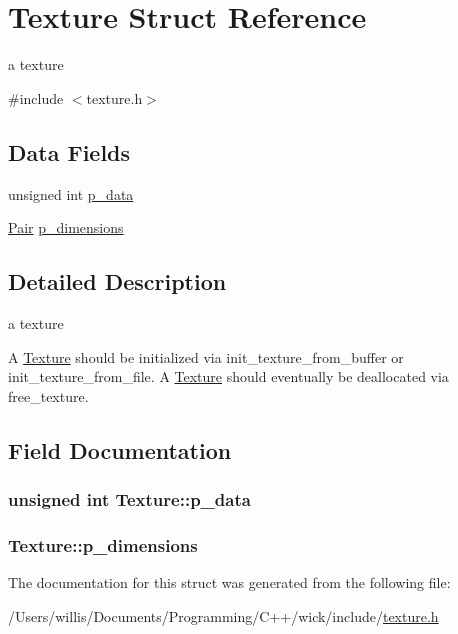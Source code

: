 \hypertarget{struct_texture}{\section{Texture Struct Reference}
\label{struct_texture}
}


a texture  




{\ttfamily \#include $<$texture.\-h$>$}

\subsection*{Data Fields}
\begin{DoxyCompactItemize}
\item 
unsigned int \hyperlink{struct_texture_ab6c572cac09b4bc4ed509d5a9d7b2984}{p\-\_\-data}
\item 
\hyperlink{struct_pair}{Pair} \hyperlink{struct_texture_af9f05640abd9159b4e960e4140b3d936}{p\-\_\-dimensions}
\end{DoxyCompactItemize}


\subsection{Detailed Description}
a texture 

A \hyperlink{struct_texture}{Texture} should be initialized via init\-\_\-texture\-\_\-from\-\_\-buffer or init\-\_\-texture\-\_\-from\-\_\-file. A \hyperlink{struct_texture}{Texture} should eventually be deallocated via free\-\_\-texture. 

\subsection{Field Documentation}
\hypertarget{struct_texture_ab6c572cac09b4bc4ed509d5a9d7b2984}{
\subsubsection[{p\-\_\-data}]{\setlength{\rightskip}{0pt plus 5cm}unsigned int Texture\-::p\-\_\-data}}\label{struct_texture_ab6c572cac09b4bc4ed509d5a9d7b2984}
\hypertarget{struct_texture_af9f05640abd9159b4e960e4140b3d936}{
\subsubsection[{p\-\_\-dimensions}]{ Texture\-::p\-\_\-dimensions}}\label{struct_texture_af9f05640abd9159b4e960e4140b3d936}


The documentation for this struct was generated from the following file\-:\begin{DoxyCompactItemize}
\item 
/\-Users/willis/\-Documents/\-Programming/\-C++/wick/include/\hyperlink{texture_8h}{texture.\-h}\end{DoxyCompactItemize}
